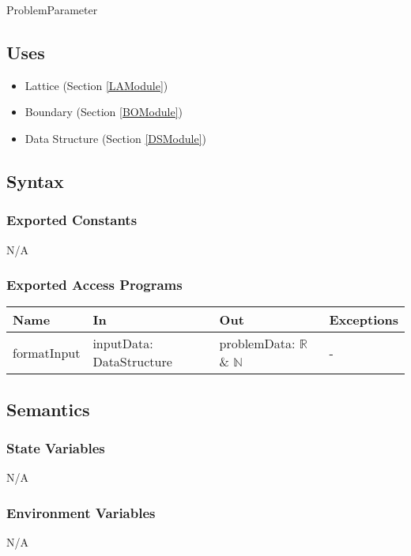 \documentclass[12pt, titlepage]{article}
\begin{document}
ProblemParameter

\subsection{Uses}

\begin{itemize}
	\item Lattice (Section \ref{LAModule})
	\item Boundary (Section \ref{BOModule})
	\item Data Structure (Section \ref{DSModule})
\end{itemize}

\subsection{Syntax}

\subsubsection{Exported Constants}
N/A

\subsubsection{Exported Access Programs}

\begin{center}
	\begin{tabular}{p{2cm} p{3cm} p{4cm} p{2cm}}
		\hline
		\textbf{Name} & \textbf{In} & \textbf{Out} & \textbf{Exceptions} \\
		\hline
		formatInput & inputData: DataStructure & problemData: $\mathbb{R}$ \& $\mathbb{N}$ & - \\
		\hline
	\end{tabular}
\end{center}

\subsection{Semantics}

\subsubsection{State Variables}
N/A

\subsubsection{Environment Variables}
N/A
\end{document}
